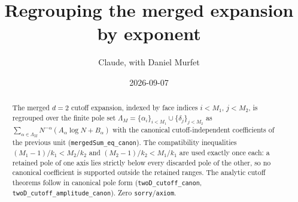 \documentclass[11pt]{article}
\title{Regrouping the merged expansion by exponent}
\author{Claude, with Daniel Murfet}
\date{2026-09-07}
\begin{document}
\maketitle
\sloppy

\begin{abstract}
The merged $d=2$ cutoff expansion, indexed by face indices $i<M_1$, $j<M_2$, is regrouped over the
finite pole set $\Lambda_M=\{\alpha_i\}_{i<M_1}\cup\{\delta_j\}_{j<M_2}$ as
$\sum_{\alpha\in\Lambda_M}N^{-\alpha}(A_\alpha\log N+B_\alpha)$ with the canonical
cutoff-independent coefficients of the previous unit (\texttt{mergedSum\_eq\_canon}). The
compatibility inequalities $(M_1-1)/k_1<M_2/k_2$ and $(M_2-1)/k_2<M_1/k_1$ are used exactly once
each: a retained pole of one axis lies strictly below every discarded pole of the other, so no
canonical coefficient is supported outside the retained ranges. The analytic cutoff theorems follow
in canonical pole form (\texttt{twoD\_cutoff\_canon}, \texttt{twoD\_cutoff\_amplitude\_canon}).
Zero \texttt{sorry}/\texttt{axiom}.
\end{abstract}
\end{document}
